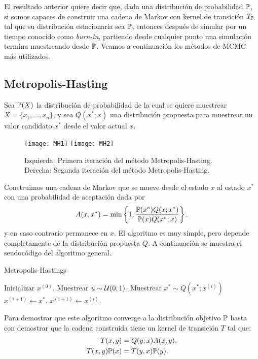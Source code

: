 El resultado anterior quiere decir que, dada una distribución de probabilidad \(\mathbb{P}\), si somos capaces de construir una cadena de Markov con kernel de transición \(T_{\mathbb{P}}\) tal que su distribución estacionaria sea \(\mathbb{P}\), entonces después de simular por un tiempo conocido como \emph{burn-in}, partiendo desde cualquier punto una simulación termina muestreando desde \(\mathbb{P}\). Veamos a continuación los métodos de MCMC más utilizados.

\subsection{Metropolis-Hasting}

Sea \(\mathbb{P}(X)\) la distribución de probabilidad de la cual se quiere muestrear \(X = \{x_1, \dotsc, x_n\}\), y sea \(Q(x^{\ast}; x)\) una distribución propuesta para muestrear un valor candidato \(x^{\ast}\) desde el valor actual \(x\).
\begin{figure}[h]
	\centering
	\texttt{[image: MH1]}
	\texttt{[image: MH2]}
	\caption{Izquierda: Primera iteración del método Metropolis-Hasting. Derecha: Segunda iteración del método Metropolis-Hasting.}
	\label{fig:MH}
\end{figure}
Construimos una cadena de Markov que se mueve desde el estado \(x\) al estado \(x^{\ast}\) con una probabilidad de aceptación dada por
\begin{equation*}
A(x, x^{\ast}) = \min \left\{1, \frac{\mathbb{P}(x^{\ast}) Q(x; x^{\ast})}{\mathbb{P}(x) Q(x^{\ast}; x)} \right\}.
\end{equation*}
y en caso contrario permanece en \(x\). El algoritmo es muy simple, pero depende completamente de la distribución propuesta \(Q\). A continuación se muestra el seudocódigo del algoritmo general.

\begin{algorithm}[h]
	\caption{Metropolis-Hastings}
	\begin{algorithmic}[1]
		\State Inicializar \(x^{(0)}\).
		\State Muestrear \(u \sim \mathcal{U}(0, 1)\).
		\State Muestrear \(x^{\ast} \sim Q(x^{\ast}; x^{(i)})\)
		\State \(x^{(i + 1)} \gets x^{\ast}\).
		\Else
		\State \(x^{(i + 1)} \gets x^{(i)}\).
		\EndIf
		\EndFor
	\end{algorithmic}
\end{algorithm}

Para demostrar que este algoritmo converge a la distribución objetivo \(\mathbb{P}\) basta con demostrar que la cadena construida tiene un kernel de transición \(T\) tal que:
\begin{align*}
T(x, y)				&= Q(y; x) A(x, y),\\
T(x, y) \mathbb{P}(x)	&= T(y, x) \mathbb{P}(y).
\end{align*}

